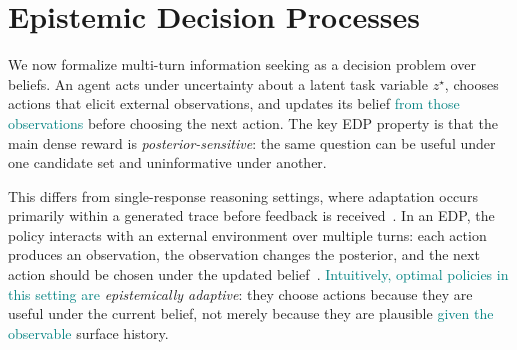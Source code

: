\documentclass[11pt]{article}
\newcommand{\nk}[1]{\textcolor{teal}{#1}}
\theoremstyle{plain}
\theoremstyle{definition}
\theoremstyle{remark}
\begin{document}
\vspace*{-3mm}
\section{Epistemic Decision Processes}
\label{sec:edp_theory}
\vspace*{-3mm}



 

We now formalize multi-turn information seeking as a decision problem over beliefs. An agent acts under uncertainty about a latent task variable \(z^\star\), chooses actions that elicit external observations, and updates its belief \nk{from those observations} before choosing the next action. The key EDP property is that the main dense reward is \textit{posterior-sensitive}: the same question can be useful under one candidate set and uninformative under another.




 

This differs from single-response reasoning settings, where adaptation occurs primarily within a generated trace before feedback is received~\citep{zhang2025markovianreflectiveexplorationbayesadaptive}. In an EDP, the policy interacts with an external environment over multiple turns: each action produces an observation, the observation changes the posterior, and the next action should be chosen under the updated belief~\citep{abdulhai2023lmrl}. 
\nk{Intuitively, optimal policies in this setting are}
\emph{epistemically adaptive}: they choose actions because they are useful under the current belief, not merely because they are plausible \nk{given the observable} surface history.
\end{document}

